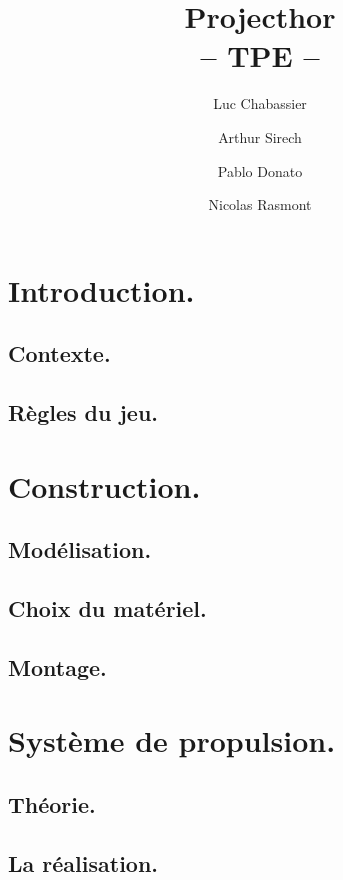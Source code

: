 \documentclass{report}
\title{Projecthor\\-- TPE --}
\author{Luc Chabassier \and Arthur Sirech \and Pablo Donato \and Nicolas Rasmont}
\begin{document}
\maketitle

\tableofcontents

\part{Introduction.}
\chapter{Contexte.} \label{intro}


\chapter{Règles du jeu.} \label{regles}


\part{Construction.}
\chapter{Modélisation.} \label{moter}
% 

\chapter{Choix du matériel.} \label{mater} %
% 
% 

\chapter{Montage.} \label{mont}
% 

\part{Système de propulsion.}
\chapter{Théorie.} \label{theo}
% 

\chapter{La réalisation.} \label{rea}
% 
\end{document}
